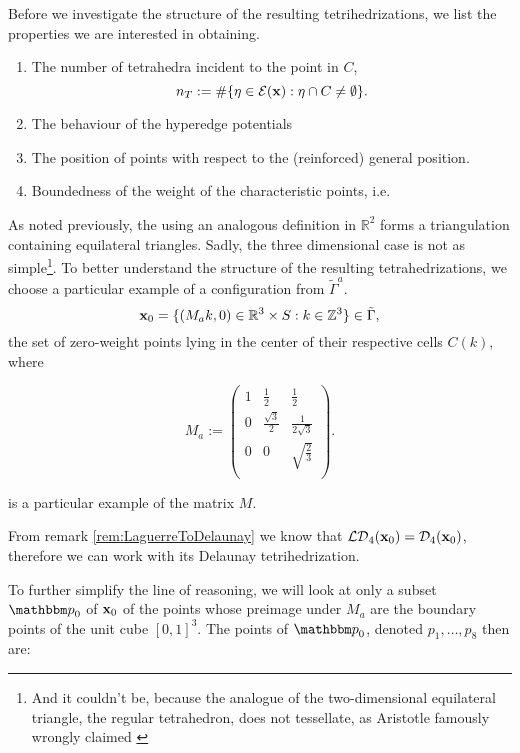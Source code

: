 Before we investigate the structure of the resulting tetrihedrizations, we list the properties we are interested in obtaining.
\begin{enumerate}
	\item The number of tetrahedra incident to the point in $C$,  
		$$n_T := \# \{\eta \in \mathcal E({\mathbf{x}}): \eta \cap C \neq \emptyset\}.$$
	\item The behaviour of the hyperedge potentials
	\item The position of points with respect to the (reinforced) general position.  
	\item Boundedness of the weight of the characteristic points, i.e.
\end{enumerate}

As noted previously, the using an analogous definition in $\mathbb R^2$ forms a triangulation containing equilateral triangles. Sadly, the three dimensional case is not as simple\footnote{And it couldn't be, because the analogue of the two-dimensional equilateral triangle, the regular tetrahedron, does not tessellate, as Aristotle famously wrongly claimed \cite{Lagarias12}}.
To better understand the structure of the resulting tetrahedrizations, we choose a particular example of a configuration from $\tilde\Gamma^a$. 
$${\mathbf{x}}_0 = \{(M_ak,0) \in {\mathbb R^3}\times S: k \in \mathbb Z^3\} \in \tilde\Gamma,$$ 
the set of zero-weight points lying in the center of their respective cells $C(k)$, where

$$
M_a := \begin{pmatrix}
1 & \frac 12 & \frac 12 \\
0 & \frac {\sqrt{3}}2 & \frac 1{2\sqrt{3}}  \\
0 & 0 & \sqrt{\frac 23} \\
\end{pmatrix}.
$$

is a particular example of the matrix $M$.

From remark \ref{rem:LaguerreToDelaunay} we know that $\mathcal {LD}_4({\mathbf{x}}_0) = \mathcal D_4({\mathbf{x}}_0)$, therefore we can work with its Delaunay tetrihedrization.

To further simplify the line of reasoning, we will look at only a subset $\p_0$ of ${\mathbf{x}}_0$ of the points whose preimage under $M_a$ are the boundary points of the unit cube $[0,1]^3$. The points of $\p_0$, denoted $p_1, \dots, p_8$ then are:

